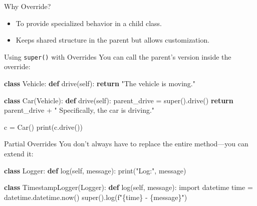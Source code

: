 \documentclass[
  letterpaper,
  DIV=11,
  numbers=noendperiod]{scrreprt}
\newenvironment{Shaded}{\begin{snugshade}}{\end{snugshade}}
\newcommand{\BuiltInTok}[1]{\textcolor[rgb]{0.00,0.23,0.31}{#1}}
\newcommand{\ControlFlowTok}[1]{\textcolor[rgb]{0.00,0.23,0.31}{\textbf{#1}}}
\newcommand{\ImportTok}[1]{\textcolor[rgb]{0.00,0.46,0.62}{#1}}
\newcommand{\KeywordTok}[1]{\textcolor[rgb]{0.00,0.23,0.31}{\textbf{#1}}}
\newcommand{\NormalTok}[1]{\textcolor[rgb]{0.00,0.23,0.31}{#1}}
\newcommand{\OperatorTok}[1]{\textcolor[rgb]{0.37,0.37,0.37}{#1}}
\newcommand{\SpecialCharTok}[1]{\textcolor[rgb]{0.37,0.37,0.37}{#1}}
\newcommand{\SpecialStringTok}[1]{\textcolor[rgb]{0.13,0.47,0.30}{#1}}
\newcommand{\StringTok}[1]{\textcolor[rgb]{0.13,0.47,0.30}{#1}}
\newcommand{\VariableTok}[1]{\textcolor[rgb]{0.07,0.07,0.07}{#1}}
\providecommand{\tightlist}{%
  \setlength{\itemsep}{0pt}\setlength{\parskip}{0pt}}
\begin{document}
Why Override?

\begin{itemize}
\tightlist
\item
  To provide specialized behavior in a child class.
\item
  Keeps shared structure in the parent but allows customization.
\end{itemize}

Using \texttt{super()} with Overrides You can call the parent's version
inside the override:

\begin{Shaded}
\begin{Highlighting}[]
\KeywordTok{class}\NormalTok{ Vehicle:}
    \KeywordTok{def}\NormalTok{ drive(}\VariableTok{self}\NormalTok{):}
        \ControlFlowTok{return} \StringTok{"The vehicle is moving."}

\KeywordTok{class}\NormalTok{ Car(Vehicle):}
    \KeywordTok{def}\NormalTok{ drive(}\VariableTok{self}\NormalTok{):}
\NormalTok{        parent\_drive }\OperatorTok{=} \BuiltInTok{super}\NormalTok{().drive()}
        \ControlFlowTok{return}\NormalTok{ parent\_drive }\OperatorTok{+} \StringTok{" Specifically, the car is driving."}

\NormalTok{c }\OperatorTok{=}\NormalTok{ Car()}
\BuiltInTok{print}\NormalTok{(c.drive())}
\end{Highlighting}
\end{Shaded}

Partial Overrides You don't always have to replace the entire
method---you can extend it:

\begin{Shaded}
\begin{Highlighting}[]
\KeywordTok{class}\NormalTok{ Logger:}
    \KeywordTok{def}\NormalTok{ log(}\VariableTok{self}\NormalTok{, message):}
        \BuiltInTok{print}\NormalTok{(}\StringTok{"Log:"}\NormalTok{, message)}

\KeywordTok{class}\NormalTok{ TimestampLogger(Logger):}
    \KeywordTok{def}\NormalTok{ log(}\VariableTok{self}\NormalTok{, message):}
        \ImportTok{import}\NormalTok{ datetime}
\NormalTok{        time }\OperatorTok{=}\NormalTok{ datetime.datetime.now()}
        \BuiltInTok{super}\NormalTok{().log(}\SpecialStringTok{f"}\SpecialCharTok{\{}\NormalTok{time}\SpecialCharTok{\}}\SpecialStringTok{ {-} }\SpecialCharTok{\{}\NormalTok{message}\SpecialCharTok{\}}\SpecialStringTok{"}\NormalTok{)}
\end{Highlighting}
\end{Shaded}
\end{document}

